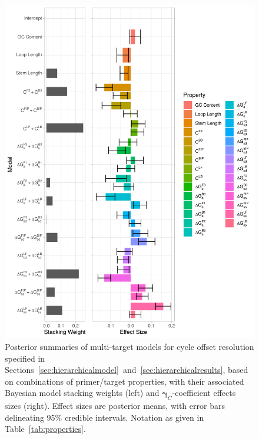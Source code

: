 \documentclass[../thesis.tex]{subfiles}
\begin{document}
\begin{figure}[!tpb] 
\centering
\includegraphics[width=5in]{../figures/chapter2/paper_eval_fig.png}
\caption{Posterior summaries of multi-target models for cycle offset resolution specified in Sections~\ref{sec:hierarchicalmodel}~and~\ref{sec:hierarchicalresults}, based on combinations of primer/target properties, with their associated Bayesian model stacking weights (left) and $\bm{\gamma}_C$-coefficient effects sizes (right). Effect sizes are posterior means, with error bars delineating 95\% credible intervals. Notation as given in Table~\ref{tab:properties}.\label{fig:hierarchical_stacking_c}}
\end{figure}
\end{document}
